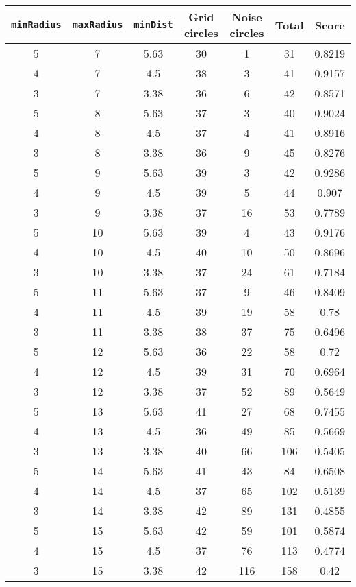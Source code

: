 \documentclass[letterpaper, 12pt]{article}
\begin{document}
\begin{longtable}{|c|c|c|c|c|c|c|}
\hline
\textbf{\texttt{minRadius}} & \textbf{\texttt{maxRadius}} & \textbf{\texttt{minDist}} & \textbf{Grid circles} & \textbf{Noise circles} & \textbf{Total} & \textbf{Score} \\
\hline
5 & 7 & 5.63 & 30 & 1 & 31 & 0.8219 \\
\hline
4 & 7 & 4.5 & 38 & 3 & 41 & 0.9157 \\
\hline
3 & 7 & 3.38 & 36 & 6 & 42 & 0.8571 \\
\hline
5 & 8 & 5.63 & 37 & 3 & 40 & 0.9024 \\
\hline
4 & 8 & 4.5 & 37 & 4 & 41 & 0.8916 \\
\hline
3 & 8 & 3.38 & 36 & 9 & 45 & 0.8276 \\
\hline
5 & 9 & 5.63 & 39 & 3 & 42 & 0.9286 \\
\hline
4 & 9 & 4.5 & 39 & 5 & 44 & 0.907 \\
\hline
3 & 9 & 3.38 & 37 & 16 & 53 & 0.7789 \\
\hline
5 & 10 & 5.63 & 39 & 4 & 43 & 0.9176 \\
\hline
4 & 10 & 4.5 & 40 & 10 & 50 & 0.8696 \\
\hline
3 & 10 & 3.38 & 37 & 24 & 61 & 0.7184 \\
\hline
5 & 11 & 5.63 & 37 & 9 & 46 & 0.8409 \\
\hline
4 & 11 & 4.5 & 39 & 19 & 58 & 0.78 \\
\hline
3 & 11 & 3.38 & 38 & 37 & 75 & 0.6496 \\
\hline
5 & 12 & 5.63 & 36 & 22 & 58 & 0.72 \\
\hline
4 & 12 & 4.5 & 39 & 31 & 70 & 0.6964 \\
\hline
3 & 12 & 3.38 & 37 & 52 & 89 & 0.5649 \\
\hline
5 & 13 & 5.63 & 41 & 27 & 68 & 0.7455 \\
\hline
4 & 13 & 4.5 & 36 & 49 & 85 & 0.5669 \\
\hline
3 & 13 & 3.38 & 40 & 66 & 106 & 0.5405 \\
\hline
5 & 14 & 5.63 & 41 & 43 & 84 & 0.6508 \\
\hline
4 & 14 & 4.5 & 37 & 65 & 102 & 0.5139 \\
\hline
3 & 14 & 3.38 & 42 & 89 & 131 & 0.4855 \\
\hline
5 & 15 & 5.63 & 42 & 59 & 101 & 0.5874 \\
\hline
4 & 15 & 4.5 & 37 & 76 & 113 & 0.4774 \\
\hline
3 & 15 & 3.38 & 42 & 116 & 158 & 0.42 \\

\end{longtable}
\end{document}
